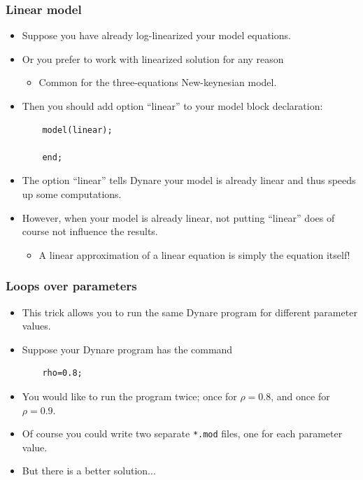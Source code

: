 \documentclass{beamer}
\begin{document}
\begin{frame}[fragile]
\frametitle{Linear model}
\begin{itemize}
	\item Suppose you have already log-linearized your model equations.
	\item Or you prefer to work with linearized solution for any reason
	\begin{itemize}
		\item Common for the three-equations New-keynesian model.
	\end{itemize}
    \item Then you should add option ``linear'' to your model block declaration:
    \begin{verbatim}
    model(linear);                                   
    
    end;
    \end{verbatim}
    \item The option ``linear'' tells Dynare your model is already linear and thus speeds up some computations. 
    \item However, when your model is already linear, not putting ``linear'' does of course not influence the results. 
    \begin{itemize}
    	\item A linear approximation of a linear equation is simply the equation itself!
    \end{itemize} 
\end{itemize}
\end{frame}

\begin{frame}[fragile]
\frametitle{Loops over parameters}
\begin{itemize}
	\item This trick allows you to run the same Dynare program for
	different parameter values.
	\item Suppose your Dynare program has the command
	\begin{verbatim}
	rho=0.8;
	\end{verbatim}
	\item You would like to run the program twice; once for $ \rho=0.8 $, and
	once for $ \rho=0.9 $.
	\item Of course you could write two separate \texttt{*.mod} files, one for each parameter value.
	\item But there is a better solution...
\end{itemize}
\end{frame}
\end{document}
